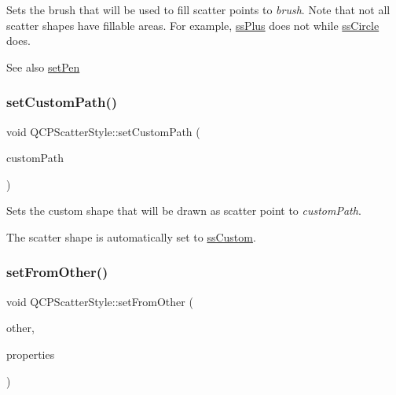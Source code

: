 Sets the brush that will be used to fill scatter points to {\itshape brush}. Note that not all scatter shapes have fillable areas. For example, \hyperlink{classQCPScatterStyle_adb31525af6b680e6f1b7472e43859349a2d7f1d3c1a148b9d9d17f2fd9cae5eb7}{ss\+Plus} does not while \hyperlink{classQCPScatterStyle_adb31525af6b680e6f1b7472e43859349a7c92a110880d0ef2170dff3a5b4f7779}{ss\+Circle} does.

\begin{DoxySeeAlso}{See also}
\hyperlink{classQCPScatterStyle_a761f1f229cc0ca4703e1e2b89f6dd1ba}{set\+Pen} 
\end{DoxySeeAlso}
\mbox{\label{classQCPScatterStyle_a96a3e949f90b2afe5677ca9412a12a1e}} 
\subsubsection{\texorpdfstring{set\+Custom\+Path()}{setCustomPath()}}
{\footnotesize\ttfamily void Q\+C\+P\+Scatter\+Style\+::set\+Custom\+Path (\begin{DoxyParamCaption}\item[{const Q\+Painter\+Path \&}]{custom\+Path }\end{DoxyParamCaption})}

Sets the custom shape that will be drawn as scatter point to {\itshape custom\+Path}.

The scatter shape is automatically set to \hyperlink{classQCPScatterStyle_adb31525af6b680e6f1b7472e43859349a15d9bcfd9de94edda949006529f9219d}{ss\+Custom}. \mbox{\label{classQCPScatterStyle_a7d59ba8864914f765817841089e436f1}} 
\subsubsection{\texorpdfstring{set\+From\+Other()}{setFromOther()}}
{\footnotesize\ttfamily void Q\+C\+P\+Scatter\+Style\+::set\+From\+Other (\begin{DoxyParamCaption}\item[{const \hyperlink{classQCPScatterStyle}{Q\+C\+P\+Scatter\+Style} \&}]{other,  }\item[{Scatter\+Properties}]{properties }\end{DoxyParamCaption})}

